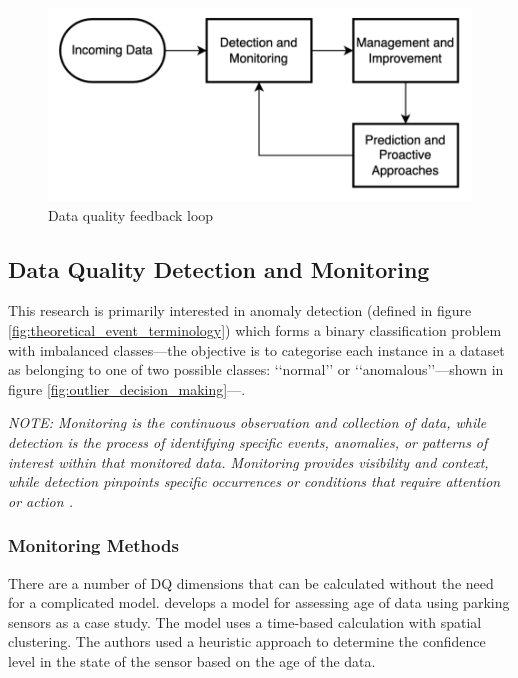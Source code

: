 \begin{figure}[h]
    \centering
    \includegraphics[]{figures/literature_review/dq_feedback_loop.png}
    \caption{Data quality feedback loop}
    \label{fig:dq_feedback_loop}
\end{figure}

\subsection{Data Quality Detection and Monitoring}\label{ssec:data_quality_detection}

This research is primarily interested in anomaly detection (defined in figure \ref{fig:theoretical_event_terminology}) which forms a binary classification problem with imbalanced classes---the objective is to categorise each instance in a dataset as belonging to one of two
possible classes: ‘‘normal’’ or ‘‘anomalous’’---shown in figure \ref{fig:outlier_decision_making}---\citep{gorsheninMobileNetworkTraffic2024}.

{\color{secondary-text-color} \textit{NOTE: Monitoring is the continuous observation and collection of data, while detection is the process of identifying specific events, anomalies, or patterns of interest within that monitored data. Monitoring provides visibility and context, while detection pinpoints specific occurrences or conditions that require attention or action \citep{tuychievComprehensiveIntroductionAnomaly2023}.}}

\subsubsection{Monitoring Methods}
There are a number of DQ dimensions that can be calculated without the need for a complicated model. \cite{fizzaAgeDataAware2022} develops a model for assessing age of data using parking sensors as a case study. The model uses a time-based calculation with spatial clustering. The authors used a heuristic approach to determine the confidence level in the state of the sensor based on the age of the data.

